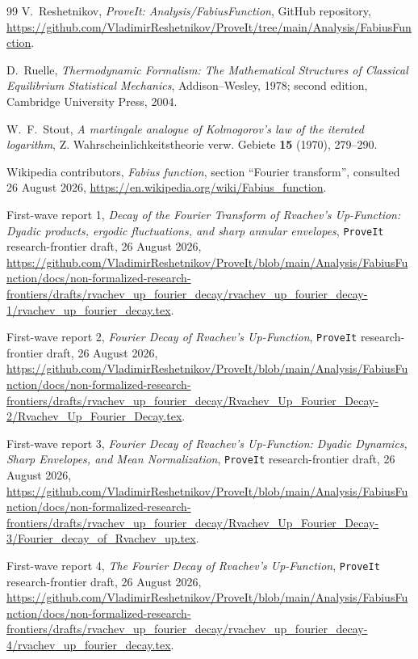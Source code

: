 \documentclass[11pt,oneside]{article}
\theoremstyle{definition}
\theoremstyle{remark}
\begin{document}
\begin{thebibliography}{99}
V.~Reshetnikov,
\newblock \emph{ProveIt: Analysis/FabiusFunction}, GitHub repository,
\newblock \url{https://github.com/VladimirReshetnikov/ProveIt/tree/main/Analysis/FabiusFunction}.

D.~Ruelle,
\newblock \emph{Thermodynamic Formalism: The Mathematical Structures of
Classical Equilibrium Statistical Mechanics},
\newblock Addison--Wesley, 1978; second edition, Cambridge University Press,
2004.

W.~F.~Stout,
\newblock \emph{A martingale analogue of Kolmogorov's law of the iterated
logarithm},
\newblock Z. Wahrscheinlichkeitstheorie verw. Gebiete \textbf{15} (1970),
279--290.

Wikipedia contributors,
\newblock \emph{Fabius function}, section ``Fourier transform'',
\newblock consulted 26 August 2026,
\newblock \url{https://en.wikipedia.org/wiki/Fabius_function}.

First-wave report 1,
\newblock \emph{Decay of the Fourier Transform of Rvachev's Up-Function:
Dyadic products, ergodic fluctuations, and sharp annular envelopes},
\newblock \texttt{ProveIt} research-frontier draft, 26 August 2026,
\newblock \url{https://github.com/VladimirReshetnikov/ProveIt/blob/main/Analysis/FabiusFunction/docs/non-formalized-research-frontiers/drafts/rvachev_up_fourier_decay/rvachev_up_fourier_decay-1/rvachev_up_fourier_decay.tex}.

First-wave report 2,
\newblock \emph{Fourier Decay of Rvachev's Up-Function},
\newblock \texttt{ProveIt} research-frontier draft, 26 August 2026,
\newblock \url{https://github.com/VladimirReshetnikov/ProveIt/blob/main/Analysis/FabiusFunction/docs/non-formalized-research-frontiers/drafts/rvachev_up_fourier_decay/Rvachev_Up_Fourier_Decay-2/Rvachev_Up_Fourier_Decay.tex}.

First-wave report 3,
\newblock \emph{Fourier Decay of Rvachev's Up-Function: Dyadic Dynamics,
Sharp Envelopes, and Mean Normalization},
\newblock \texttt{ProveIt} research-frontier draft, 26 August 2026,
\newblock \url{https://github.com/VladimirReshetnikov/ProveIt/blob/main/Analysis/FabiusFunction/docs/non-formalized-research-frontiers/drafts/rvachev_up_fourier_decay/Rvachev_Up_Fourier_Decay-3/Fourier_decay_of_Rvachev_up.tex}.

First-wave report 4,
\newblock \emph{The Fourier Decay of Rvachev's Up-Function},
\newblock \texttt{ProveIt} research-frontier draft, 26 August 2026,
\newblock \url{https://github.com/VladimirReshetnikov/ProveIt/blob/main/Analysis/FabiusFunction/docs/non-formalized-research-frontiers/drafts/rvachev_up_fourier_decay/rvachev_up_fourier_decay-4/rvachev_up_fourier_decay.tex}.


\end{thebibliography}
\end{document}
